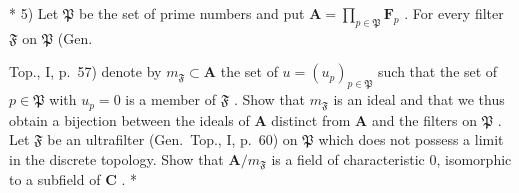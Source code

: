 * 5) Let \(\mathfrak{P}\) be the set of prime numbers and put \(\mathbf{A} = \prod_{p\in \mathfrak{P}}\mathbf{F}_p\) . For every filter \(\mathfrak{F}\) on \(\mathfrak{P}\) (Gen.

Top., I, p.~57) denote by \(m_{\mathfrak{F}} \subset \mathbf{A}\) the set of \(u = (u_p)_{p \in \mathfrak{P}}\) such that the set of \(p \in \mathfrak{P}\) with \(u_p = 0\) is a member of \(\mathfrak{F}\) . Show that \(m_{\mathfrak{F}}\) is an ideal and that we thus obtain a bijection between the ideals of \(\mathbf{A}\) distinct from \(\mathbf{A}\) and the filters on \(\mathfrak{P}\) . Let \(\mathfrak{F}\) be an ultrafilter (Gen.~Top., I, p.~60) on \(\mathfrak{P}\) which does not possess a limit in the discrete topology. Show that \(\mathbf{A}/m_{\mathfrak{F}}\) is a field of characteristic 0, isomorphic to a subfield of \(\mathbf{C}\) . *

